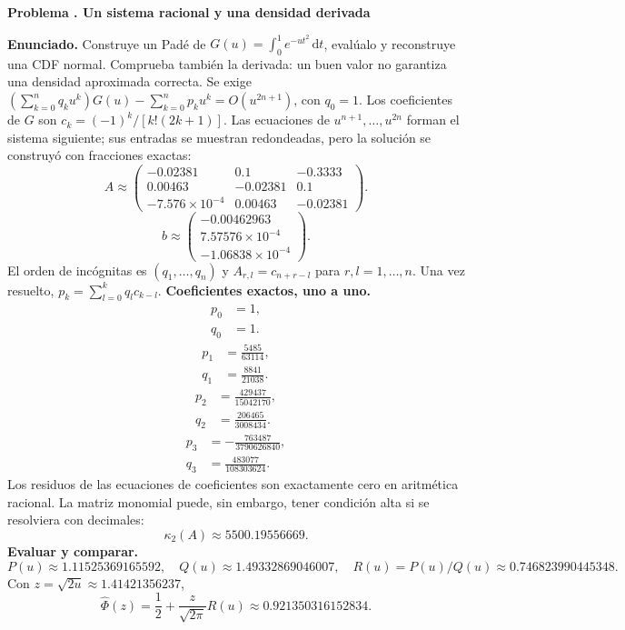\documentclass[11pt,a4paper]{article}
\newcommand{\dd}{\,\mathrm d}
\theoremstyle{definition}
\newcounter{problema}
\newenvironment{resuelto}[1]{\refstepcounter{problema}\par\medskip\Needspace{6\baselineskip}\textbf{Problema \theproblema. #1}\par}{\par\medskip}
\begin{document}
\begin{resuelto}{Un sistema racional y una densidad derivada}
\textbf{Enunciado.} Construye un Padé de $G(u)=\int_0^1e^{-ut^2}\dd t$, evalúalo y reconstruye una CDF normal. Comprueba también la derivada: un buen valor no garantiza una densidad aproximada correcta.
Se exige $(\sum_{k=0}^{n}q_ku^k)G(u)-\sum_{k=0}^{n}p_ku^k=O(u^{2n+1})$, con $q_0=1$. Los coeficientes de $G$ son $c_k=(-1)^k/[k!(2k+1)]$.
Las ecuaciones de $u^{n+1},\ldots,u^{2n}$ forman el sistema siguiente; sus entradas se muestran redondeadas, pero la solución se construyó con fracciones exactas:
{\small
\[
A\approx\begin{pmatrix}-0.02381&0.1&-0.3333\\0.00463&-0.02381&0.1\\-7.576\times10^{-4}&0.00463&-0.02381\end{pmatrix}.
\]
\[
b\approx\begin{pmatrix}-0.00462963\\7.57576\times10^{-4}\\-1.06838\times10^{-4}\end{pmatrix}.
\]
}
El orden de incógnitas es $(q_1,\ldots,q_n)$ y $A_{r,l}=c_{n+r-l}$ para $r,l=1,\ldots,n$. Una vez resuelto, $p_k=\sum_{l=0}^{k}q_lc_{k-l}$.
\textbf{Coeficientes exactos, uno a uno.}
\[
\begin{aligned}p_0&=1,\\q_0&=1.\end{aligned}
\]
\[
\begin{aligned}p_1&=\frac{5485}{63114},\\q_1&=\frac{8841}{21038}.\end{aligned}
\]
\[
\begin{aligned}p_2&=\frac{429437}{15042170},\\q_2&=\frac{206465}{3008434}.\end{aligned}
\]
\[
\begin{aligned}p_3&=-\frac{763487}{3790626840},\\q_3&=\frac{483077}{108303624}.\end{aligned}
\]
Los residuos de las ecuaciones de coeficientes son exactamente cero en aritmética racional. La matriz monomial puede, sin embargo, tener condición alta si se resolviera con decimales:
\[
\kappa_2(A)\approx5500.19556669.
\]
\textbf{Evaluar y comparar.}
\[
P(u)\approx1.11525369165592,\quad Q(u)\approx1.49332869046007,\quad R(u)=P(u)/Q(u)\approx0.746823990445348.
\]
Con $z=\sqrt{2u}\approx1.41421356237$,
\[
\widehat\Phi(z)=\frac12+\frac z{\sqrt{2\pi}}R(u)\approx0.921350316152834.
\]
\end{resuelto}
\end{document}
